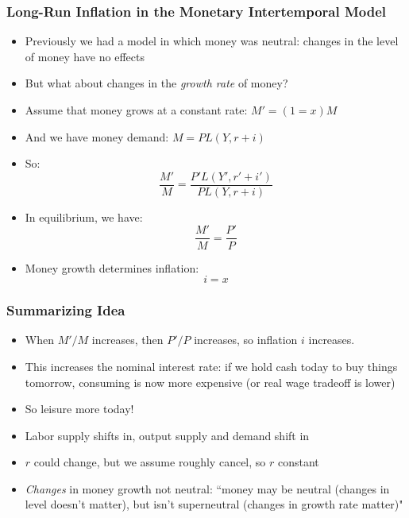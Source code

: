 \documentclass{beamer}
\begin{document}
\begin{frame}
\frametitle[alignment=center]{Long-Run Inflation in the Monetary Intertemporal Model}
\begin{itemize}
\item Previously we had a model in which money was neutral: changes in the level of money have no effects
\smallskip
\item But what about changes in the \emph{growth rate} of money?
\smallskip
\item Assume that money grows at a constant rate: $M'=(1=x)M$
\smallskip
\item And we have money demand:  $M=PL(Y,r+i)$
\smallskip
\item So:
$$\frac{M'}{M}=\frac{P'L(Y',r'+i')}{PL(Y,r+i)}$$
\item In equilibrium, we have:
$$\frac{M'}{M}=\frac{P'}{P}$$
\item Money growth determines inflation:
$$i=x$$
\end{itemize}
\end{frame}


\begin{frame}
\frametitle[alignment=center]{Summarizing Idea}
\begin{itemize}
\item When $M'/M$ increases, then $P'/P$ increases, so inflation $i$ increases.
\bigskip
\item This increases the nominal interest rate: if we hold cash today to buy things tomorrow, consuming is now more expensive (or real wage tradeoff is lower)
\bigskip
\item So leisure more today!
\bigskip
\item Labor supply shifts in, output supply and demand shift in
\bigskip
\item $r$ could change, but we assume roughly cancel, so $r$ constant
\bigskip
\item \emph{Changes} in money growth not neutral: ``money may be neutral (changes in level doesn't matter), but isn't superneutral (changes in growth rate matter)"
\end{itemize}
\end{frame}
\end{document}
